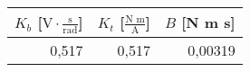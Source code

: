 \begin{tabular}{r|r|r}
$K_b$ [$\text{V}\cdot\frac{\text{s}}{\text{rad}}$]&$K_t$ [$\frac{\text{N m}}{\text{A}}$]&$B$ [N m s]\\\hline
0,517&0,517&0,00319\\
\end{tabular}
